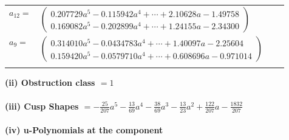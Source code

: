 \documentclass[1p]{elsarticle_modified}
\theoremstyle{definition}
\begin{document}
\begin{tabular}{m{7pt} m{180pt} m{7pt} m{180pt} }
\flushright $a_{12}=$&$\begin{pmatrix}0.207729 a^{5}-0.115942 a^{4}+\cdots+2.10628 a-1.49758\\0.169082 a^{5}-0.202899 a^{4}+\cdots+1.24155 a-2.34300\end{pmatrix}$ \\
\flushright $a_{9}=$&$\begin{pmatrix}0.314010 a^{5}-0.0434783 a^{4}+\cdots+1.40097 a-2.25604\\0.159420 a^{5}-0.0579710 a^{4}+\cdots+0.608696 a-0.971014\end{pmatrix}$\\&\end{tabular}
\flushleft \textbf{(ii) Obstruction class $= 1$}\\~\\
\flushleft \textbf{(iii) Cusp Shapes $= -\frac{25}{207} a^5-\frac{13}{69} a^4-\frac{38}{69} a^3-\frac{13}{23} a^2+\frac{122}{207} a-\frac{1832}{207}$}\\~\\
\newpage\renewcommand{\arraystretch}{1}
\flushleft \textbf{(iv) u-Polynomials at the component}\newline \\
\end{document}
